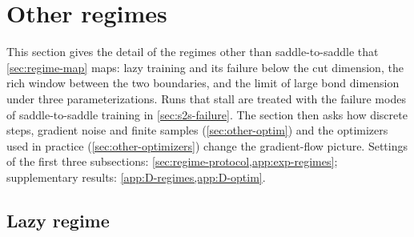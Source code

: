 \section{Other regimes}\label{sec:other-regimes}

This section gives the detail of the regimes other than saddle-to-saddle that \cref{sec:regime-map} maps: lazy
training and its failure below the cut dimension, the rich window between the two boundaries, and the limit of
large bond dimension under three parameterizations. Runs that stall are treated with the failure modes of
saddle-to-saddle training in \cref{sec:s2s-failure}.\label{sec:other-stalled} The section then asks how
discrete steps, gradient noise and finite samples (\cref{sec:other-optim}) and the optimizers used in practice
(\cref{sec:other-optimizers}) change the gradient-flow picture. Settings of the first three subsections:
\cref{sec:regime-protocol,app:exp-regimes}; supplementary results: \cref{app:D-regimes,app:D-optim}.

\subsection{Lazy regime}\label{sec:other-lazy}

